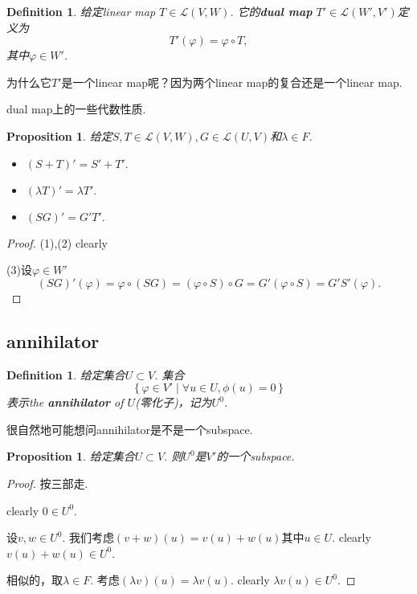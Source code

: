 \documentclass{article}
\newtheorem{proposition}[theorem]{Proposition}
\newtheorem{definition}[theorem]{Definition}
\newcommand\Set[2]{\{\,#1\mid#2\,\}} %
\begin{document}
\begin{definition}
\rm 给定linear map $T \in \mathcal{L}(V,W)$. 它的\textbf{dual map} $T' \in \mathcal{L}(W',V')$定义为
$$
T'(\varphi) = \varphi \circ T,
$$
其中$\varphi \in W'$.
\end{definition}

{\color{blue} 为什么它$T'$是一个linear map呢？因为两个linear map的复合还是一个linear map}. 

{\color{red} dual map上的一些代数性质}.
\begin{proposition}
给定$S,T \in \mathcal{L}(V,W),G \in \mathcal{L}(U,V)$和$\lambda \in F$.
\begin{itemize}
	\item $(S+T)' = S' + T'.$
	\item $(\lambda T)' = \lambda T'.$
	\item $(SG)' = G'T'.$
\end{itemize}
\end{proposition}

\begin{proof}
(1),(2) clearly

(3)设$\varphi \in W'$
$$
(SG)'(\varphi) = \varphi \circ (SG) = (\varphi \circ S) \circ G = G'(\varphi \circ S) = G'S'(\varphi).
$$
\end{proof}

\newpage
\subsection{annihilator}

\begin{definition}
\rm 给定集合$U \subset V$. 集合
$$
\Set{\varphi \in V'}{\forall u \in U,\phi(u) =  0}
$$
表示the \textbf{annihilator} of $U$(零化子)，记为$U^0$.
\end{definition}

{\color{red} 很自然地可能想问annihilator是不是一个subspace}.
\begin{proposition}
\rm 给定集合$U \subset V$. 则$U^0$是$V'$的一个subspace.
\end{proposition}

\begin{proof}
按三部走.

clearly $0 \in U^0$.

设$v,w \in U^0$. 我们考虑$(v+w)(u) = v(u)+w(u)$其中$u \in U$. clearly $v(u)+w(u) \in U^0$.

相似的，取$\lambda \in F$. 考虑$(\lambda v)(u)=\lambda v(u)$. clearly $\lambda v(u) \in U^0.$
\end{proof}
\end{document}
